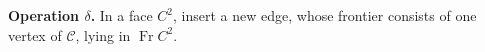 \textbf{Operation $\delta$.} In a face $C^2$, insert a new edge, whose frontier consists of one vertex of $\mathcal{C}$, lying in $\operatorname{Fr} C^2$.
